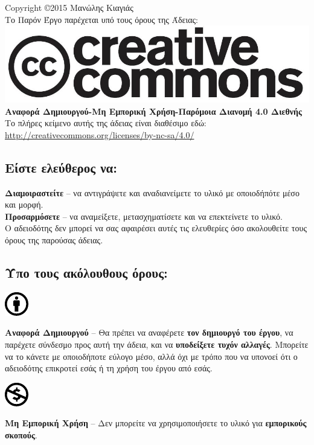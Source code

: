 %
%
\begin{center}
Copyright \copyright 2015 Μανώλης Κιαγιάς\\
Το Παρόν Έργο παρέχεται υπό τους όρους της Άδειας:\\
\includegraphics[scale=0.2]{images/license/cc-logo}\\
\textbf{Αναφορά Δημιουργού-Μη Εμπορική Χρήση-Παρόμοια Διανομή 4.0 Διεθνής}\\
Το πλήρες κείμενο αυτής της άδειας είναι διαθέσιμο εδώ:\\
\url{http://creativecommons.org/licenses/by-nc-sa/4.0/}
\end{center}
\subsection*{Είστε ελεύθερος να:}
\noindent
\textbf{Διαμοιραστείτε} -- να αντιγράψετε και αναδιανείμετε το υλικό με οποιοδήπότε μέσο και μορφή.\\
\textbf{Προσαρμόσετε} -- να αναμείξετε, μετασχηματίσετε και να επεκτείνετε το υλικό.\\

Ο αδειοδότης δεν μπορεί να σας αφαιρέσει αυτές τις ελευθερίες όσο ακολουθείτε τους όρους της παρούσας άδειας.
\subsection*{Ύπο τους ακόλουθους όρους:}

\vspace{1em}
\noindent
\parbox{1.5cm}{\includegraphics[scale=1.5]{images/license/cc_by_30}}
\parbox{10.5cm}{\textbf{Αναφορά Δημιουργού} -- Θα πρέπει να αναφέρετε \textbf{τον δημιουργό του έργου}, να παρέχετε σύνδεσμο προς αυτή την άδεια, και να \textbf{υποδείξετε τυχόν αλλαγές}. Μπορείτε να το κάνετε με οποιοδήποτε εύλογο μέσο, αλλά όχι με τρόπο που να υπονοεί ότι ο αδειοδότης επικροτεί εσάς ή τη χρήση του έργου από εσάς.}

\vspace{1em}
\noindent
\parbox{1.5cm}{\includegraphics[scale=1.5]{images/license/cc_nc_30}}
\parbox{10.5cm}{\textbf{Μη Εμπορική Χρήση} --  Δεν μπορείτε να χρησιμοποιήσετε το υλικό για \textbf{εμπορικούς σκοπούς}.}

